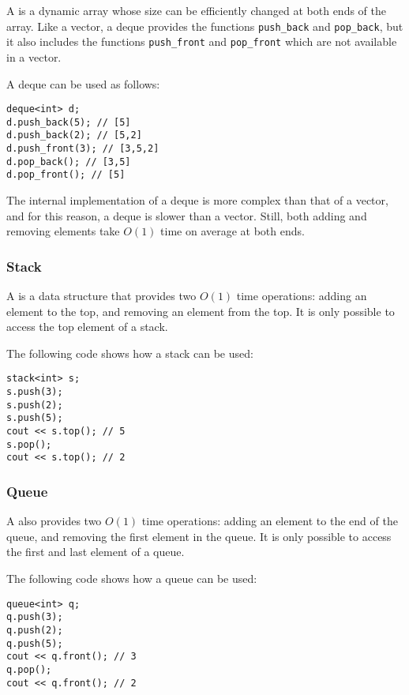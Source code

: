 
A  is a dynamic array
whose size can be efficiently
changed at both ends of the array.
Like a vector, a deque provides the functions
\texttt{push\_back} and \texttt{pop\_back}, but
it also includes the functions
\texttt{push\_front} and \texttt{pop\_front}
which are not available in a vector.

A deque can be used as follows:
\begin{lstlisting}
deque<int> d;
d.push_back(5); // [5]
d.push_back(2); // [5,2]
d.push_front(3); // [3,5,2]
d.pop_back(); // [3,5]
d.pop_front(); // [5]
\end{lstlisting}

The internal implementation of a deque
is more complex than that of a vector,
and for this reason, a deque is slower than a vector.
Still, both adding and removing
elements take $O(1)$ time on average at both ends.

\subsubsection{Stack}


A 
is a data structure that provides two
$O(1)$ time operations:
adding an element to the top,
and removing an element from the top.
It is only possible to access the top
element of a stack.

The following code shows how a stack can be used:
\begin{lstlisting}
stack<int> s;
s.push(3);
s.push(2);
s.push(5);
cout << s.top(); // 5
s.pop();
cout << s.top(); // 2
\end{lstlisting}
\subsubsection{Queue}


A  also
provides two $O(1)$ time operations:
adding an element to the end of the queue,
and removing the first element in the queue.
It is only possible to access the first
and last element of a queue.

The following code shows how a queue can be used:
\begin{lstlisting}
queue<int> q;
q.push(3);
q.push(2);
q.push(5);
cout << q.front(); // 3
q.pop();
cout << q.front(); // 2
\end{lstlisting}

